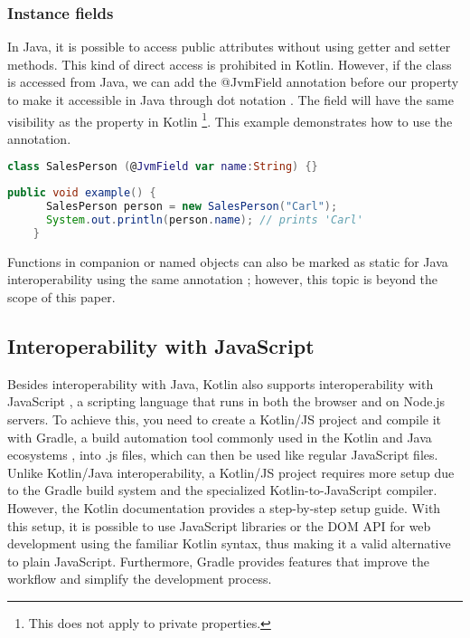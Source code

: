 \documentclass[a4paper, 11pt]{article}
\begin{document}
\subsubsection{Instance fields}
  In Java, it is possible to access public attributes without using getter and setter methods. This kind of direct access is prohibited in Kotlin. However, if the class is accessed from Java, we can add the @JvmField annotation before our property to make it accessible in Java through dot notation \cite{interop-instance-fields}. The field will have the same visibility as the property in Kotlin \footnote{This does not apply to private properties.}.
  This example demonstrates how to use the annotation.
  \begin{lstlisting}[language=Kotlin]
    class SalesPerson (@JvmField var name:String) {}
  \end{lstlisting}
  \begin{lstlisting}[language=Java]
    public void example() {
      SalesPerson person = new SalesPerson("Carl");
      System.out.println(person.name); // prints 'Carl'
    }
  \end{lstlisting}

  Functions in companion or named objects can also be marked as static for Java interoperability using the same annotation \cite{interop-static-fields}; however, this topic is beyond the scope of this paper.

\subsection{Interoperability with JavaScript}
  Besides interoperability with Java, Kotlin also supports interoperability with JavaScript \cite{interopjs}, a scripting language that runs in both the browser and on Node.js servers. To achieve this, you need to create a Kotlin/JS project and compile it with Gradle, a build automation tool commonly used in the Kotlin and Java ecosystems \cite{gradle}, into .js files, which can then be used like regular JavaScript files. Unlike Kotlin/Java interoperability, a Kotlin/JS project requires more setup due to the Gradle build system and the specialized Kotlin-to-JavaScript compiler. However, the Kotlin documentation \cite{interopjs} provides a step-by-step setup guide. With this setup, it is possible to use JavaScript libraries or the DOM API \cite{interopjs-dom} for web development using the familiar Kotlin syntax, thus making it a valid alternative to plain JavaScript. Furthermore, Gradle provides features that improve the workflow and simplify the development process.
\end{document}
